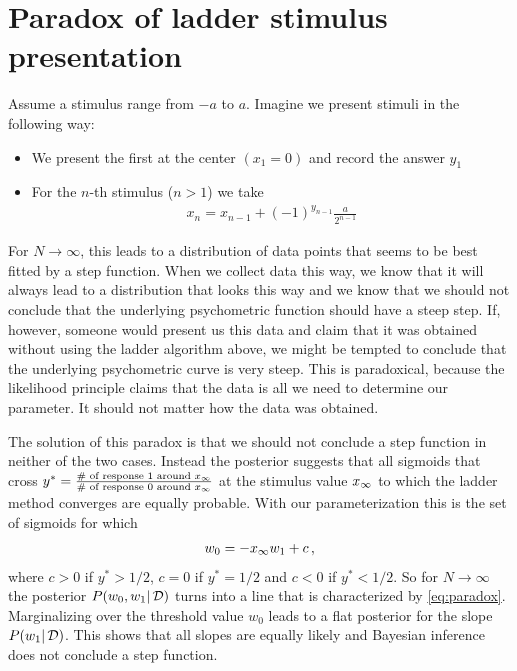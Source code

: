 \section{Paradox of ladder stimulus presentation} %
\label{sec:paradox_of_ladder_stimulus_presentation}

Assume a stimulus range from $-a$ to $a$. Imagine we present stimuli in the following way:
\begin{itemize}
	\item We present the first at the center $(x_1=0)$ and record the answer $y_1$
	\item For the $n$-th stimulus ($n>1$) we take
	\begin{align}
		x_n = x_{n-1} + (-1)^{y_{n-1}} \frac{a}{2^{n-1}}
	\end{align}
\end{itemize}
For $N \to \infty$, this leads to a distribution of data points that seems to be best fitted by a step function.
When we collect data this way, we know that it will always lead to a distribution that looks this way and we know that we should not conclude that the underlying psychometric function should have a steep step.
If, however, someone would present us this data and claim that it was obtained without using the ladder algorithm above, we might be tempted to conclude that the underlying psychometric curve is very steep. This is paradoxical, because the likelihood principle claims that the data is all we need to determine our parameter. It should not matter how the data was obtained.

The solution of this paradox is that we should not conclude a step function in neither of the two cases. Instead the posterior suggests that all sigmoids that cross $y^* = \frac{\#\text{ of response 1 around } x_\infty}{\#\text{ of response 0 around } x_\infty}$ at the stimulus value $x_\infty$ to which the ladder method converges are equally probable. 
With our parameterization this is the set of sigmoids for which
\begin{align}\label{eq:paradox}
 w_0 = -x_\infty w_1 + c \,,	
\end{align}
where $c > 0$ if $y^* > 1/2$, $c = 0$ if $y^* = 1/2$ and $c < 0$ if $y^* < 1/2$.
So for $N \to \infty$ the posterior ${P(w_0, w_1 | \,\mathcal{D})}$ turns into a line that is characterized by \cref{eq:paradox}. \\
Marginalizing over the threshold value $w_0$ leads to a flat posterior for the slope ${P(w_1 | \,\mathcal{D})}$. This shows that all slopes are equally likely and Bayesian inference does not conclude a step function.

